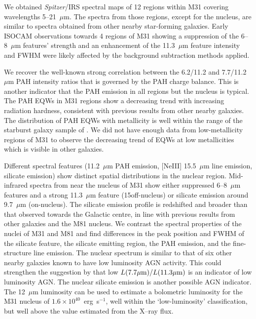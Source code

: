 We  obtained {\em Spitzer}/IRS spectral maps of 12 regions within M31 covering wavelengths 5--21~$\mu$m. 
The spectra from those regions, except for the nucleus, are similar to spectra obtained from other nearby  star-forming galaxies. 
Early  ISOCAM observations towards 4 regions of M31 showing a suppression 
of the 6--8~$\mu$m features' strength and an enhancement of  the 11.3~$\mu$m feature intensity and FWHM \citep{1998Cesarsky} were likely affected by the background subtraction methods applied.

We recover the well-known strong correlation between the 6.2/11.2 and 7.7/11.2 $\mu$m PAH intensity ratios that is governed by the PAH charge balance.  This is another indicator that the PAH emission in all regions but the nucleus is typical. The PAH EQWs in M31 regions show a decreasing trend with increasing radiation hardness, consistent with previous 
results from other nearby galaxies. The distribution of PAH EQWs with metallicity is well within the range of the starburst galaxy sample of \citet{Engelbracht_2008}. 
We did not have enough data from low-metallicity regions of M31 to observe the decreasing trend of EQWs at low metallicities which is visible in other galaxies.

Different spectral features (11.2~$\mu$m PAH emission, [NeIII] 15.5~$\mu$m line emission, silicate emission) show distinct spatial distributions in the nuclear region. Mid-infrared spectra from near the nucleus of M31 show either suppressed 6--8~$\mu$m features and a strong 11.3~$\mu$m feature
(15\arcsec off-nucleus) or silicate emission around 9.7~$\mu$m  (on-nucleus). The silicate emission profile is redshifted and broader than that observed towards the Galactic centre, in line with previous results from other galaxies and the M81 nucleus.  We contrast the spectral properties of the nuclei of M31 and M81 and find differences in the peak position and FWHM of the silicate feature, the silicate emitting region, the PAH emission, and the fine-structure line emission. 
The nuclear spectrum is similar to that of six other nearby galaxies known to have low luminosity AGN activity. This could strengthen the
suggestion by \citet{Smith:2007lr} that low $L(7.7\mu{\rm m})/L(11.3\mu{\rm m})$ is an indicator of low luminosity AGN. %
The nuclear silicate emission is another possible AGN indicator.
The 12~$\mu$m luminosity can be used to estimate a bolometric luminosity for the M31 nucleus of $1.6\times 10^{40}$~erg~s$^{-1}$,
well within the `low-luminosity' classification, but well above the value estimated from the X--ray flux.
